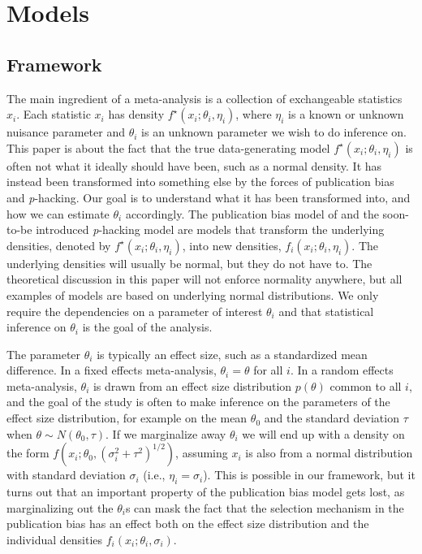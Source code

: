 \documentclass{article}
\theoremstyle{plain}
\theoremstyle{definition}
\renewcommand{\sqrt}[1]{(#1)^{1/2}}
\begin{document}
\section{Models}\label{sect:models}
\subsection{Framework}
The main ingredient of a meta-analysis is a collection of exchangeable statistics $x_{i}$. Each statistic $x_{i}$ has density $f^{\star}(x_{i};\theta_{i},\eta_{i})$, where $\eta_i$ is a known or unknown nuisance parameter and $\theta_{i}$ is an unknown parameter we wish to do inference on. This paper is about the fact that the true data-generating model $f^{\star}(x_{i};\theta_{i},\eta_{i})$ is often not what it ideally should have been, such as a normal density. It has instead been transformed into something else by the forces of publication bias and \textit{p}-hacking. Our goal is to understand what it has been transformed into, and how we can estimate $\theta_{i}$ accordingly. The publication bias model of \citet{hedges1992modeling,iyengar1988selection} and the soon-to-be introduced \textit{p}-hacking model are models that transform the underlying densities, denoted by $f^{\star}(x_{i};\theta_{i},\eta_{i})$, into new densities, $f_{i}(x_{i};\theta_{i},\eta_{i})$. The underlying densities will usually be normal, but they do not have to. The theoretical discussion in this paper will not enforce normality anywhere, but all examples of models are based on underlying normal distributions. We only require the dependencies on a parameter of interest $\theta_{i}$ and that statistical inference on $\theta_{i}$ is the goal of the analysis.

The parameter $\theta_{i}$ is typically an effect size, such as a standardized mean difference. In a fixed effects meta-analysis, $\theta_{i}=\theta$ for all $i$. In a random effects meta-analysis, $\theta_{i}$ is drawn from an effect size distribution $p(\theta)$ common to all $i$, and the goal of the study is often to make inference on the parameters of the effect size distribution, for example on the mean $\theta_{0}$ and the standard deviation $\tau$ when $\theta \sim N(\theta_{0},\tau)$. If we marginalize away $\theta_{i}$ we will end up with a density on the form $f(x_{i}; \theta_{0},\sqrt{\sigma_{i}^{2}+\tau^{2}})$, assuming $x_{i}$ is also from a normal distribution with standard deviation $\sigma_{i}$ (i.e., $\eta_i = \sigma_i$). This is possible in our framework, but it turns out that an important property of the publication bias model gets lost, as marginalizing out the $\theta_{i}$s can mask the fact that the selection mechanism in the publication bias has an effect both on the effect size distribution and the individual densities $f_{i}(x_{i};\theta_i, \sigma_i)$.
\end{document}
